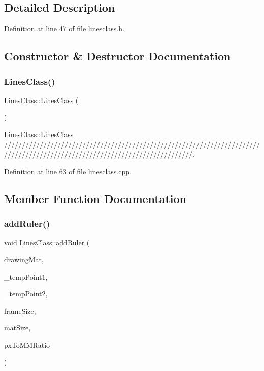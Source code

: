 \subsection{Detailed Description}


Definition at line 47 of file linesclass.\+h.



\subsection{Constructor \& Destructor Documentation}
\mbox{\label{classLinesClass_a27cc25678359a1897ad8b29390e612cc}} 
\subsubsection{\texorpdfstring{LinesClass()}{LinesClass()}}
{\footnotesize\ttfamily Lines\+Class\+::\+Lines\+Class (\begin{DoxyParamCaption}{ }\end{DoxyParamCaption})}



\mbox{\hyperlink{classLinesClass_a27cc25678359a1897ad8b29390e612cc}{Lines\+Class\+::\+Lines\+Class}} /////////////////////////////////////////////////////////////////////////////////////////////////////////////////////////////. 



Definition at line 63 of file linesclass.\+cpp.



\subsection{Member Function Documentation}
\mbox{\label{classLinesClass_ab61cc7912d5903aec574d53847e7ebf2}} 
\subsubsection{\texorpdfstring{addRuler()}{addRuler()}}
{\footnotesize\ttfamily void Lines\+Class\+::add\+Ruler (\begin{DoxyParamCaption}\item[{Mat \&}]{drawing\+Mat,  }\item[{Q\+Point}]{\+\_\+temp\+Point1,  }\item[{Q\+Point}]{\+\_\+temp\+Point2,  }\item[{Q\+Size}]{frame\+Size,  }\item[{Q\+Size}]{mat\+Size,  }\item[{double}]{px\+To\+M\+M\+Ratio }\end{DoxyParamCaption})}



